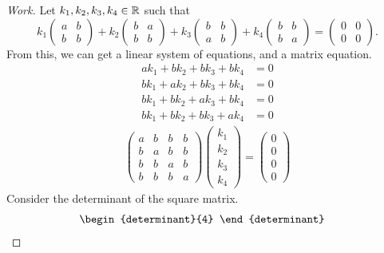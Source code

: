 \documentclass{article}
\begin{document}
\begin{proof}[Work]
  Let $k_1,k_2,k_3,k_4 \in \mathbb{R}$ such that
  \[
    k_1\begin{pmatrix}
      a & b \\
      b & b
    \end{pmatrix} + k_2 \begin{pmatrix}
      b & a \\
      b & b
    \end{pmatrix} + k_3 \begin{pmatrix}
      b & b \\
      a & b
    \end{pmatrix} + k_4\begin{pmatrix}
      b & b \\
      b & a
    \end{pmatrix} = \begin{pmatrix}
      0 & 0 \\
      0 & 0
    \end{pmatrix}.
  \]
  From this, we can get a linear system of equations, and a matrix equation.
  \begin{align*}
    ak_1 + bk_2 + bk_3 + bk_4 & = 0 \\
    bk_1 + ak_2 + bk_3 + bk_4 & = 0 \\
    bk_1 + bk_2 + ak_3 + bk_4 & = 0 \\
    bk_1 + bk_2 + bk_3 + ak_4 & = 0
  \end{align*}
  \begin{align*}
    \begin{pmatrix}
      a & b & b & b \\
      b & a & b & b \\
      b & b & a & b \\
      b & b & b & a
    \end{pmatrix}
    \begin{pmatrix}
      k_1 \\ k_2 \\ k_3 \\ k_4
    \end{pmatrix} =
    \begin{pmatrix}
      0 \\ 0 \\ 0 \\ 0
    \end{pmatrix}
  \end{align*}
  Consider the determinant of the square matrix.
  \begin{align*}
     & \begin{determinant}{4}

\end{determinant}
\end{align*}
\end{proof}
\end{document}
